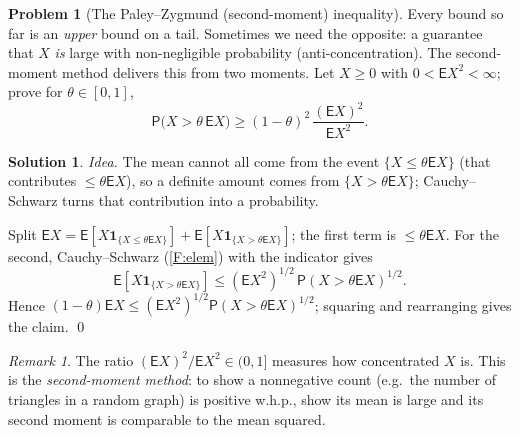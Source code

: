 \documentclass[14pt]{extarticle}
\theoremstyle{definition}
\newtheorem{exercise}{Problem}
\newtheorem*{solution}{Solution}
\theoremstyle{remark}
\newtheorem*{remark}{Remark}
\newcommand\expc{\mathsf{E}}
\newcommand\prb{\mathsf{P}}
\begin{document}
\begin{exercise}[The Paley--Zygmund (second-moment) inequality]\label{prob:pz}
Every bound so far is an \emph{upper} bound on a tail. Sometimes we need the opposite: a guarantee that $X$ \emph{is} large with non-negligible probability (anti-concentration). The second-moment method delivers this from two moments. Let $X\ge0$ with $0<\expc X^2<\infty$; prove for $\theta\in[0,1]$,
\[
\prb\bigl(X>\theta\,\expc X\bigr)\ge(1-\theta)^2\,\frac{(\expc X)^2}{\expc X^2}.
\]
\end{exercise}
\begin{solution}
\emph{Idea.} The mean cannot all come from the event $\{X\le\theta\expc X\}$ (that contributes $\le\theta\expc X$), so a definite amount comes from $\{X>\theta\expc X\}$; Cauchy--Schwarz turns that contribution into a probability.

Split $\expc X=\expc[X\mathbf 1_{\{X\le\theta\expc X\}}]+\expc[X\mathbf 1_{\{X>\theta\expc X\}}]$; the first term is $\le\theta\expc X$. For the second, Cauchy--Schwarz (\ref{F:elem}) with the indicator gives
\[
\expc[X\mathbf 1_{\{X>\theta\expc X\}}]\le(\expc X^2)^{1/2}\,\prb(X>\theta\expc X)^{1/2}.
\]
Hence $(1-\theta)\expc X\le(\expc X^2)^{1/2}\prb(X>\theta\expc X)^{1/2}$; squaring and rearranging gives the claim. \qed
\end{solution}
\begin{remark}
The ratio $(\expc X)^2/\expc X^2\in(0,1]$ measures how concentrated $X$ is. This is the \emph{second-moment method}: to show a nonnegative count (e.g.\ the number of triangles in a random graph) is positive w.h.p., show its mean is large and its second moment is comparable to the mean squared.
\end{remark}
\end{document}
